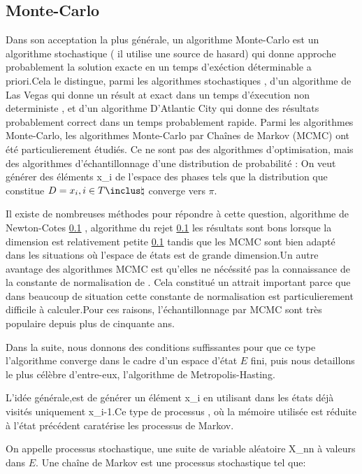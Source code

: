 \subsection{Monte-Carlo}

Dans son acceptation la plus générale, un algorithme Monte-Carlo est un algorithme stochastique ( il utilise une source de hasard) qui donne approche probablement la solution exacte en un temps d'exéction déterminable a priori.Cela le distingue, parmi les algorithmes stochastiques , d'un algorithme de Las Vegas qui donne un résult
at exact dans un temps d'éxecution non deterministe , et d'un algorithme D'Atlantic City qui donne des résultats probablement correct dans un temps probablement rapide.
Parmi les algorithmes Monte-Carlo, les algorithmes Monte-Carlo par Chaînes de Markov (MCMC) ont été particulierement étudiés.
Ce ne sont pas des algorithmes d'optimisation, mais des algorithmes d'échantillonnage d'une distribution de probabilité \pi: On veut générer des éléments x_i de l'espace des phases tels que la distribution que constitue $D={x_i, i \in T \inclus \natural}$ converge vers $\pi$.

Il existe de nombreuses méthodes pour répondre à cette question, algorithme de Newton-Cotes \ref{} , algorithme du rejet \ref{} les résultats sont bons lorsque la dimension est relativement petite \ref{} tandis que les MCMC sont bien adapté dans les situations où l'espace de états est de grande dimension.Un autre avantage des algorithmes MCMC est qu'elles ne nécéssité pas la connaissance de la constante de normalisation de \pi. Cela constitué un attrait important parce que dans beaucoup de situation cette constante de normalisation est particulierement difficile à calculer.Pour ces raisons, l'échantillonnage par MCMC sont très populaire depuis plus de cinquante ans.

Dans la suite, nous donnons des conditions suffissantes pour que ce type l'algorithme converge dans le cadre d'un espace d'état $E$ fini, puis nous detaillons le plus célèbre d'entre-eux, l'algorithme de Metropolis-Hasting.

L'idée générale,est de générer un élément x_i en utilisant dans les états déjà visités uniquement x_{i-1}.Ce type de processus , où la mémoire utilisée est réduite à l'état précédent caratérise les processus de Markov.


On appelle processus stochastique, une suite de variable aléatoire {X_n}n à valeurs dans $E$.
Une chaîne de Markov est une processus stochastique tel que:

